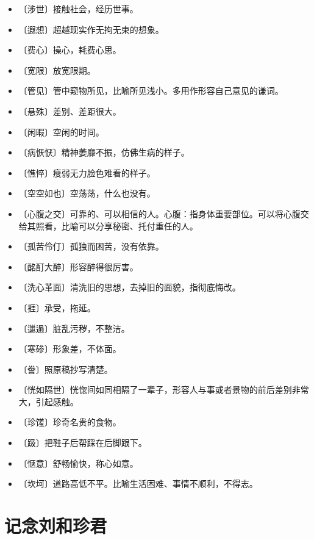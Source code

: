 \documentclass[12pt,UTF-8,openany]{ctexbook}
\begin{document}
\begin{itemize}
    \setlength\itemsep{-0.2em}
    \item 〔涉世〕接触社会，经历世事。
    \item 〔遐想〕超越现实作无拘无束的想象。
    \item 〔费心〕操心，耗费心思。
    \item 〔宽限〕放宽限期。
    \item 〔管见〕管中窥物所见，比喻所见浅小。多用作形容自己意见的谦词。
    \item 〔悬殊〕差别、差距很大。
    \item 〔闲暇〕空闲的时间。
    \item 〔病恹恹〕精神萎靡不振，仿佛生病的样子。
    \item 〔憔悴〕瘦弱无力脸色难看的样子。
    \item 〔空空如也〕空荡荡，什么也没有。
    \item 〔心腹之交〕可靠的、可以相信的人。心腹：指身体重要部位。可以将心腹交给其照看，比喻可以分享秘密、托付重任的人。
    \item 〔孤苦伶仃〕孤独而困苦，没有依靠。
    \item 〔酩酊大醉〕形容醉得很厉害。
    \item 〔洗心革面〕清洗旧的思想，去掉旧的面貌，指彻底悔改。
    \item 〔捱〕承受，拖延。
    \item 〔邋遢〕脏乱污秽，不整洁。
    \item 〔寒碜〕形象差，不体面。
    \item 〔誊〕照原稿抄写清楚。
    \item 〔恍如隔世〕恍惚间如同相隔了一辈子，形容人与事或者景物的前后差别非常大，引起感触。
    \item 〔珍馐〕珍奇名贵的食物。
    \item 〔趿〕把鞋子后帮踩在后脚跟下。
    \item 〔惬意〕舒畅愉快，称心如意。
    \item 〔坎坷〕道路高低不平。比喻生活困难、事情不顺利，不得志。
\end{itemize}

\chapter{记念刘和珍君}
\end{document}
